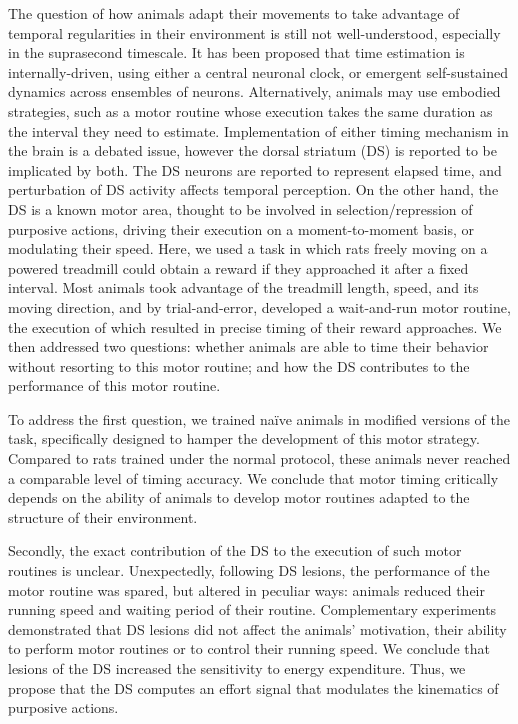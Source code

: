 The question of how animals adapt their movements to take advantage of temporal regularities in their environment is still not well-understood, especially in the suprasecond timescale.
It has been proposed that time estimation is internally-driven, using either a central neuronal clock, or emergent self-sustained dynamics across ensembles of neurons.
Alternatively, animals may use embodied strategies, such as a motor routine whose execution takes the same duration as the interval they need to estimate.
Implementation of either timing mechanism in the brain is a debated issue, however the dorsal striatum (DS) is reported to be implicated by both.
The DS neurons are reported to represent elapsed time, and perturbation of DS activity affects temporal perception.
On the other hand, the DS is a known motor area, thought to be involved in selection/repression of purposive actions, driving their execution on a moment-to-moment basis, or modulating their speed.
Here, we used a task in which rats freely moving on a powered treadmill could obtain a reward if they approached it after a fixed interval.
Most animals took advantage of the treadmill length, speed, and its moving direction, and by trial-and-error, developed a wait-and-run motor routine, the execution of which resulted in precise timing of their reward approaches.
We then addressed two questions:
    whether animals are able to time their behavior without resorting to this motor routine;
    and how the DS contributes to the performance of this motor routine.

\par

To address the first question, we trained na\"ive animals in modified versions of the task, specifically designed to hamper the development of this motor strategy.
Compared to rats trained under the normal protocol, these animals never reached a comparable level of timing accuracy.
We conclude that motor timing critically depends on the ability of animals to develop motor routines adapted to the structure of their environment.

\par

Secondly, the exact contribution of the DS to the execution of such motor routines is unclear.
Unexpectedly, following DS lesions, the performance of the motor routine was spared, but altered in peculiar ways:
    animals reduced their running speed and waiting period of their routine.
Complementary experiments demonstrated that DS lesions did not affect the animals' motivation, their ability to perform motor routines or to control their running speed.
We conclude that lesions of the DS increased the sensitivity to energy expenditure.
Thus, we propose that the DS computes an effort signal that modulates the kinematics of purposive actions.